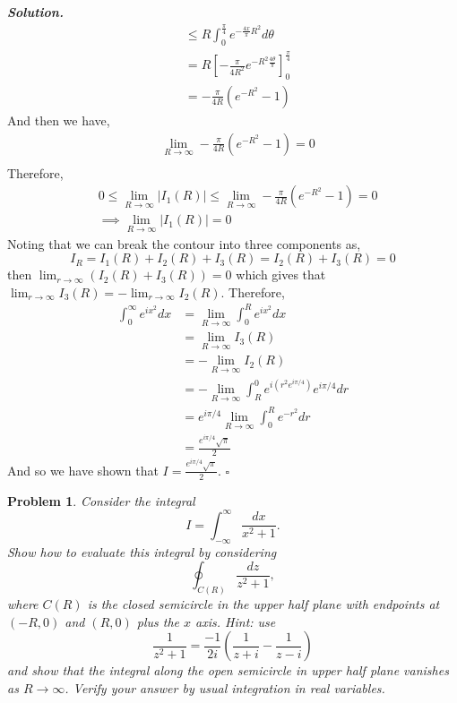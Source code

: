 \documentclass[12pt]{report}
\newtheorem{problem}{Problem}
\newenvironment{solution}[1][\it{Solution}]{\textbf{#1. } }{$\square$}
\begin{document}
\begin{solution}
\begin{align*}
        &\leq R \int_0^{\frac{\pi}{4}} e^{-\frac{4x}{\pi}R^2}d\theta\\
        &= R\left[ -\frac{\pi}{4R^2}e^{-R^2 \frac{4\theta}{\pi}}\right]_0^{\frac{\pi}{4}}\\
        &= -\frac{\pi}{4R}\left(e^{-R^2}-1\right)
    \end{align*}
    And then we have,
    \begin{align*}
        &\lim_{R \rightarrow \infty} -\frac{\pi}{4R}\left(e^{-R^2}-1\right) = 0\\
    \end{align*}
    Therefore,
    \begin{align*}
        &0 \leq \lim_{R\rightarrow \infty}|I_1(R)| \leq \lim_{R\rightarrow \infty} -\frac{\pi}{4R}\left(e^{-R^2}-1\right) = 0\\
        &\implies \lim_{R\rightarrow \infty}|I_1(R)| = 0
    \end{align*}
    Noting that we can break the contour into three components as,
    $$I_R = I_1(R) + I_2(R) + I_3(R) = I_2(R) + I_3(R) = 0$$
    then $\lim_{r\rightarrow\infty}(I_2(R) + I_3(R)) = 0$ which gives that $\lim_{r\rightarrow\infty} I_3(R) = - \lim_{r\rightarrow\infty} I_2(R)$. Therefore,
    \begin{align*}
        \int_0^\infty e^{ix^2} dx &= \lim_{R \rightarrow \infty} \int_0^R e^{ix^2}dx\\
        &= \lim_{R \rightarrow \infty} I_3(R)\\
        &= -\lim_{R \rightarrow \infty} I_2(R)\\
        &= -\lim_{R \rightarrow \infty} \int_R^0 e^{i(r^2e^{i\pi/4})} e^{i\pi/4}dr\\
        &= e^{i\pi/4}\lim_{R \rightarrow \infty} \int_0^R e^{-r^2}dr\\
        &= \frac{e^{i\pi/4}\sqrt{\pi}}{2}
    \end{align*}
    And so we have shown that $I = \frac{e^{i\pi/4}\sqrt{\pi}}{2}$.
\end{solution}

\newpage



\begin{problem}
    Consider the integral 
    $$I = \int_{-\infty}^{\infty}\frac{dx}{x^2 + 1}.$$
    Show how to evaluate this integral by considering
    $$\oint_{C(R)} \frac{dz}{z^2 + 1},$$
    where $C(R)$ is the closed semicircle in the upper half plane with endpoints at $(-R,0)$ and $(R,0)$ plus the $x$ axis. Hint: use
    $$\frac{1}{z^2 + 1} = \frac{-1}{2i}\left( \frac{1}{z+i} - \frac{1}{z-i}\right)$$
    and show that the integral along the open semicircle in upper half plane vanishes as $R \rightarrow \infty$. Verify your answer by usual integration in real variables.
\end{problem}
\end{document}
